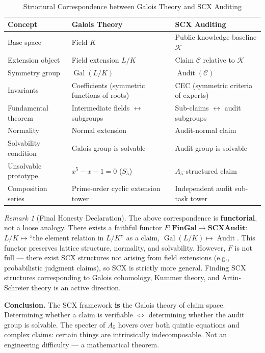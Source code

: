 \documentclass[10pt,a4paper]{article}
\theoremstyle{remark}
\newtheorem{remark}[theorem]{Remark}
\DeclareMathOperator{\Gal}{Gal}
\DeclareMathOperator{\Audit}{Audit}
\newcommand{\K}{\mathcal{K}}
\newcommand{\cC}{\mathcal{C}}
\begin{document}
\begin{table}[h]
\centering
\caption{Structural Correspondence between Galois Theory and SCX Auditing}
\small
\begin{tabular}{@{}p{3.6cm} p{3.6cm} p{4cm}@{}}
\toprule
\textbf{Concept} & \textbf{Galois Theory} & \textbf{SCX Auditing} \\
\midrule
Base space & Field $K$ & Public knowledge baseline $\K$ \\
Extension object & Field extension $L/K$ & Claim $\cC$ relative to $\K$ \\
Symmetry group & $\Gal(L/K)$ & $\Audit(\cC)$ \\
Invariants & Coefficients (symmetric functions of roots) & CEC (symmetric criteria of experts) \\
Fundamental theorem & Intermediate fields $\leftrightarrow$ subgroups & Sub-claims $\leftrightarrow$ audit subgroups \\
Normality & Normal extension & Audit-normal claim \\
Solvability condition & Galois group is solvable & Audit group is solvable \\
Unsolvable prototype & $x^5-x-1=0$ ($S_5$) & $A_5$-structured claim \\
Composition series & Prime-order cyclic extension tower & Independent audit sub-task tower \\
\bottomrule
\end{tabular}
\end{table}

\begin{remark}[Final Honesty Declaration]
The above correspondence is \textbf{functorial}, not a loose analogy. There exists a faithful functor $F: \mathbf{FinGal} \to \mathbf{SCXAudit}$: $L/K\mapsto$``the element relation in $L/K$'' as a claim, $\Gal(L/K)\mapsto\Audit$. This functor preserves lattice structure, normality, and solvability. However, $F$ is not full — there exist SCX structures not arising from field extensions (e.g., probabilistic judgment claims), so SCX is strictly more general. Finding SCX structures corresponding to Galois cohomology, Kummer theory, and Artin-Schreier theory is an active direction.
\end{remark}

\textbf{Conclusion.} The SCX framework \textbf{is} the Galois theory of claim space. Determining whether a claim is verifiable $\iff$ determining whether the audit group is solvable. The specter of $A_5$ hovers over both quintic equations and complex claims: certain things are intrinsically indecomposable. Not an engineering difficulty — a mathematical theorem.
\end{document}
